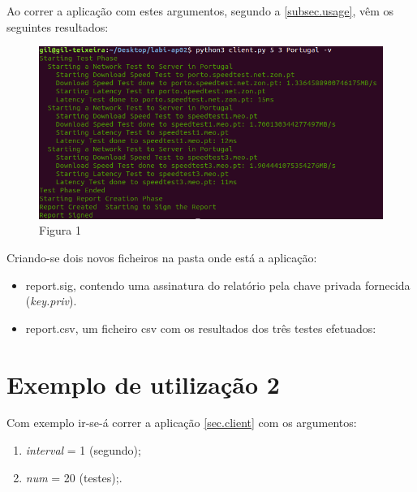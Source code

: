 \documentclass{report}
\begin{document}
Ao correr a aplicação com estes argumentos, segundo a \autoref{subsec.usage}, vêm os seguintes resultados:\\
\begin{figure}
	\includegraphics[width=\textwidth]{useExample}
	\caption{Figura 1}
\end{figure}
Criando-se dois novos ficheiros na pasta onde está a aplicação:
\begin{itemize}
\item report.sig, contendo uma assinatura do relatório pela chave privada fornecida (\textit{key.priv}).
\item report.csv, um ficheiro \ac{csv} com os resultados dos três testes efetuados:
\end{itemize}
\begin{table}[h]
\caption{Tabela 1}
\centering
{}
\end{table}

\section{Exemplo de utilização 2}
\label{sec:example2}
Com exemplo ir-se-á correr a aplicação \autoref{sec.client} com os argumentos:
\begin{enumerate}
\item \textit{interval} = 1 (segundo);
\item \textit{num} = 20 (testes);.
\end{enumerate}
\end{document}
